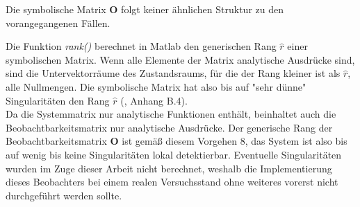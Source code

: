 \documentclass[times, 10pt,twocolumn]{article}
\begin{document}
	Die symbolische Matrix $\bm O$ folgt keiner ähnlichen Struktur zu den vorangegangenen Fällen.  \\

	Die Funktion \textit{rank()} berechnet in Matlab den generischen Rang $\hat r$ einer symbolischen Matrix. Wenn alle Elemente der Matrix analytische Ausdrücke sind, sind die Untervektorräume des Zustandsraums, für die der Rang kleiner ist als $\hat r$, alle Nullmengen. Die symbolische Matrix hat also bis auf "sehr dünne" Singularitäten den Rang $\hat r$ (\cite{ex3}, Anhang B.4). \\
	Da die Systemmatrix nur analytische Funktionen enthält, beinhaltet auch die Beobachtbarkeitsmatrix nur analytische Ausdrücke. 
	Der generische Rang der Beobachtbarkeitsmatrix $\bm O$ ist gemäß diesem Vorgehen 8, das System ist also bis auf wenig bis keine Singularitäten lokal detektierbar. Eventuelle Singularitäten wurden im Zuge dieser Arbeit nicht berechnet, weshalb die Implementierung dieses Beobachters bei einem realen Versuchsstand ohne weiteres vorerst nicht durchgeführt werden sollte. \\
	
\end{document}
